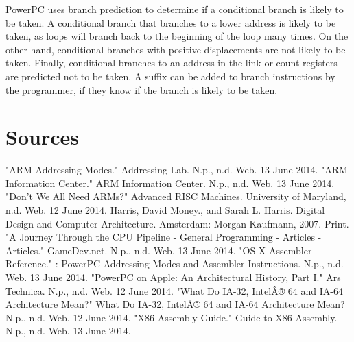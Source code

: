 \documentclass[letterpaper,10pt,titlepage,twocolumn]{article}
\begin{document}
PowerPC uses branch prediction to determine if a conditional branch is likely to be taken.
A conditional branch that branches to a lower address is likely to be taken, as loops will branch back to the beginning of the loop many times.
On the other hand, conditional branches with positive displacements are not likely to be taken.
Finally, conditional branches to an address in the link or count registers  are predicted not to be taken.
A suffix can be added to branch instructions by the programmer, if they know if the branch is likely to be taken.
\newline
\par

\section*{Sources}

"ARM Addressing Modes." Addressing Lab. N.p., n.d. Web. 13 June 2014.
\newline
"ARM Information Center." ARM Information Center. N.p., n.d. Web. 13 June 2014.
\newline
"Don't We All Need ARMs?" Advanced RISC Machines. University of Maryland, n.d. Web. 12 June 2014.
\newline
Harris, David Money., and Sarah L. Harris. Digital Design and Computer Architecture. Amsterdam: Morgan Kaufmann, 2007. Print.
\newline
"A Journey Through the CPU Pipeline - General Programming - Articles - Articles." GameDev.net. N.p., n.d. Web. 13 June 2014.
\newline
"OS X Assembler Reference." : PowerPC Addressing Modes and Assembler Instructions. N.p., n.d. Web. 13 June 2014.
\newline
"PowerPC on Apple: An Architectural History, Part I." Ars Technica. N.p., n.d. Web. 12 June 2014.
\newline
"What Do IA-32, IntelÂ® 64 and IA-64 Architecture Mean?" What Do IA-32, IntelÂ® 64 and IA-64 Architecture Mean? N.p., n.d. Web. 12 June 2014.
\newline
"X86 Assembly Guide." Guide to X86 Assembly. N.p., n.d. Web. 13 June 2014. 
\end{document}
